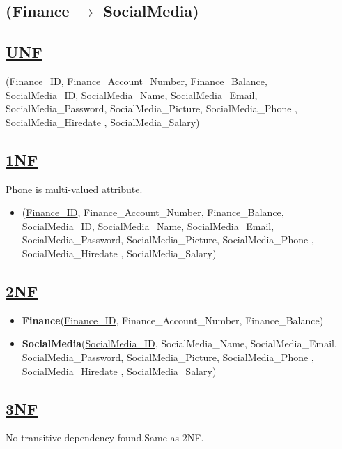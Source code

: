 \subsection{\texorpdfstring{\centering (Finance $\rightarrow$ SocialMedia)}{(Finance-SocialMedia)}}

\subsection*{\underline{UNF}}

(\underline{Finance\_ID}, Finance\_Account\_Number, Finance\_Balance,\\
\underline{SocialMedia\_ID}, SocialMedia\_Name, SocialMedia\_Email, SocialMedia\_Password, SocialMedia\_Picture, SocialMedia\_Phone ,  SocialMedia\_Hiredate , SocialMedia\_Salary)

\subsection*{\underline{1NF}}
Phone is multi-valued attribute.
\vskip 0.2in

\begin{itemize}
    \item
          (\underline{Finance\_ID}, Finance\_Account\_Number, Finance\_Balance,\\
          \underline{SocialMedia\_ID}, SocialMedia\_Name, SocialMedia\_Email, SocialMedia\_Password, SocialMedia\_Picture, SocialMedia\_Phone ,  SocialMedia\_Hiredate , SocialMedia\_Salary)
\end{itemize}

\subsection*{\underline{2NF}}
\begin{itemize}
    \item \textbf{Finance}(\underline{Finance\_ID}, Finance\_Account\_Number, Finance\_Balance)
    \item \textbf{SocialMedia}(\underline{SocialMedia\_ID}, SocialMedia\_Name, SocialMedia\_Email, SocialMedia\_Password, SocialMedia\_Picture, SocialMedia\_Phone ,  SocialMedia\_Hiredate , SocialMedia\_Salary)
\end{itemize}

\subsection*{\underline{3NF}}
No transitive dependency found.Same as 2NF.


